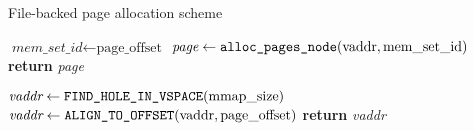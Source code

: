 \begin{algorithm}
  \caption{File-backed page allocation scheme}\label{alg:file-backed}
  \begin{algorithmic}[1]
    \State $\textit{mem\_set\_id} \gets \mbox{page\_offset}$
    \State $\textit{page} \gets \verb|alloc_pages_node|(\mbox{vaddr}, \mbox{mem\_set\_id})$
    \State \textbf{return} \textit{page}
    \EndProcedure

    \State $\textit{vaddr} \gets \verb|FIND_HOLE_IN_VSPACE|(\mbox{mmap\_size})$
    \State $\textit{vaddr} \gets \verb|ALIGN_TO_OFFSET|(\mbox{vaddr}, \mbox{page\_offset})$
    \State \textbf{return} \textit{vaddr}
    \EndProcedure
  \end{algorithmic}
\end{algorithm}